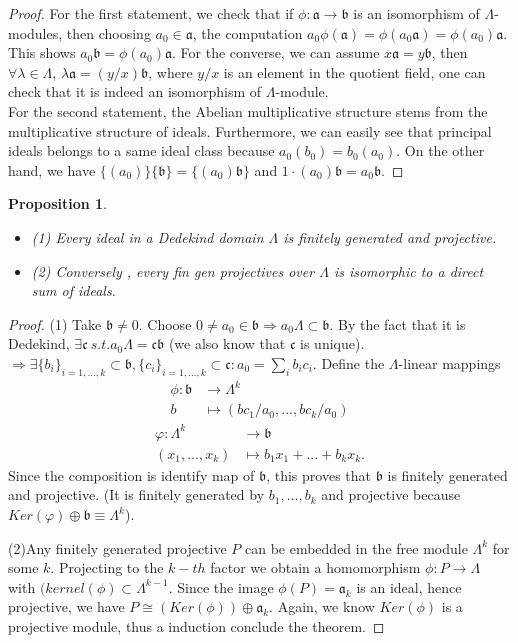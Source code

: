 \documentclass[11pt]{article}
\newtheorem{prop}[thm]{Proposition}
\newcommand{\sca}{{\mathfrak a}}
\newcommand{\scb}{{\mathfrak b}}
\newcommand{\scc}{{\mathfrak c}}
\newcommand{\rta}{\rightarrow}
\newcommand{\lrta}{\longrightarrow}
\newcommand{\Lrta}{\Longrightarrow}
\begin{document}
\begin{proof}
For the first statement, we check that if $\phi :\sca\rta\scb$ is an isomorphism of $\Lambda$-modules, then choosing $a_0\in\sca$, the computation $a_0\phi(\sca)=\phi(a_0\sca)=\phi(a_0)\sca$. This shows $a_0\scb=\phi(a_0)\sca$. For the converse, we can assume $x\sca=y\scb$, then $\forall \lambda\in \Lambda$, $\lambda \sca=(y/x)\scb$, where $y/x$ is an element in the quotient field, one can check that it is indeed an isomorphism of $\Lambda$-module.\\
For the second statement, the Abelian multiplicative structure stems from the multiplicative structure of ideals. Furthermore, we can easily see that principal ideals belongs to a same ideal class because $a_0(b_0)=b_0 (a_0)$. On the other hand, we have $\{(a_0)\}\{\scb\}=\{(a_0)\scb\}$ and $1\cdot(a_0)\scb=a_0\scb$.
\end{proof}
\begin{prop}\ 
\begin{itemize}
\item (1) Every ideal in a Dedekind domain $\Lambda$ is finitely generated and projective. 
\item (2) Conversely , every  fin gen projectives over $\Lambda$ is isomorphic to a direct sum of ideals. 
\end{itemize}
\end{prop}
\begin{proof}
(1) Take $\scb\neq 0$. 
Choose $0\neq a_0\in \scb\Lrta a_0\Lambda\subset \scb$.
By the fact that it is Dedekind, $\exists \scc \ s.t. a_0\Lambda=\scc \scb$ (we also know that $\scc$ is unique).
$\Lrta \exists \{b_i\}_{i=1,...,k}\subset \scb, \{c_i\}_{i=1,...,k}\subset \scc: a_0=\sum_i b_i c_i$. Define the $\Lambda $-linear mappings
$$
\begin{aligned}
\phi:\scb&\lrta \Lambda^k\\
b & \mapsto  (bc_1/a_0,...,b c_k/a_0)
\end{aligned}
$$
$$
\begin{aligned}
\varphi:\Lambda^k&\lrta \scb\\
(x_1,...,x_k) & \mapsto  b_1x_1+...+b_k x_k.
\end{aligned}
$$
Since the composition is identify map of $\scb$, this proves that $\scb$ is finitely generated and projective. (It is finitely generated by $b_1,...,b_k$ and projective because $Ker(\varphi)\oplus \scb\equiv\Lambda^k$).

(2)Any finitely generated projective $P$ can be embedded in the free module $\Lambda^k$ for some $k$. Projecting to the $k-th$ factor we obtain a homomorphism $\phi: P\rta \Lambda$ with $(kernel(\phi)\subset \Lambda^{k-1}$. Since the image $\phi(P)=\sca_k$ is an ideal, hence projective, we have $P\cong (Ker(\phi))\oplus \sca_k$. Again, we know $Ker(\phi)$ is a projective module, thus a induction conclude the theorem.
\end{proof}
\end{document}
